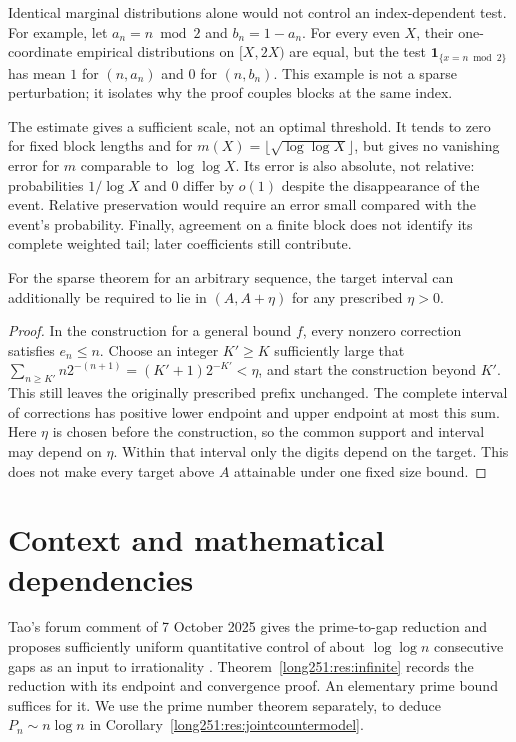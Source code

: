 \documentclass[11pt]{article}
\begin{document}
Identical marginal distributions alone would not control an
index-dependent test.  For example, let $a_n=n\bmod2$ and $b_n=1-a_n$.
For every even $X$, their one-coordinate empirical distributions on
$[X,2X)$ are equal, but the test $\mathbf{1}_{\{x=n\bmod2\}}$ has mean
$1$ for $(n,a_n)$ and $0$ for $(n,b_n)$.  This example is not a sparse
perturbation; it isolates why the proof couples blocks at the same index.

The estimate gives a sufficient scale, not an optimal threshold.  It
tends to zero for fixed block lengths and for
$m(X)=\lfloor\sqrt{\log\log X}\rfloor$, but gives no vanishing error for
$m$ comparable to $\log\log X$.  Its error is also absolute, not relative:
probabilities $1/\log X$ and $0$ differ by $o(1)$ despite the disappearance
of the event.  Relative preservation would require an error small compared
with the event's probability.  Finally, agreement on a finite block does
not identify its complete weighted tail; later coefficients still contribute.



\begin{corollary}\label{long251:res:local-targets}
For the sparse theorem for an arbitrary sequence, the target interval can additionally
be required to lie in $(A,A+\eta)$ for any prescribed $\eta>0$.
\end{corollary}
\begin{proof}
In the construction for a general bound $f$, every nonzero correction satisfies $e_n\le n$.
Choose an integer $K'\ge K$ sufficiently large that
$\sum_{n\ge K'}n2^{-(n+1)}=(K'+1)2^{-K'}<\eta$, and start the construction
beyond $K'$.  This still leaves the originally prescribed prefix unchanged.
The complete interval of corrections has positive lower endpoint and
upper endpoint at most this sum.  Here $\eta$ is chosen before the
construction, so the common support and interval may depend on $\eta$.
Within that interval only the digits depend on the target.  This does
not make every target above $A$ attainable under one fixed size bound.
\end{proof}

\section{Context and mathematical dependencies}\label{long251:sec:context}
Tao's forum comment of 7 October 2025 gives the prime-to-gap reduction
and proposes sufficiently uniform quantitative control of about
$\log\log n$ consecutive gaps as an input to irrationality
\cite[comment of 7 October 2025]{erdosproblems251thread}.
Theorem~\ref{long251:res:infinite} records the reduction with its endpoint
and convergence proof.  An elementary prime bound suffices for it.
We use the prime number theorem separately, to deduce
$P_n\sim n\log n$ in Corollary~\ref{long251:res:jointcountermodel}.
\end{document}

